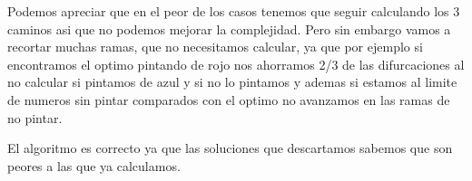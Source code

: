 Podemos apreciar que en el peor de los casos tenemos que seguir calculando los 3 caminos asi que no podemos mejorar la complejidad. Pero sin embargo vamos a recortar muchas ramas, que no necesitamos calcular, ya que por ejemplo si encontramos el optimo pintando de rojo nos ahorramos 2/3 de las difurcaciones al no calcular si pintamos de azul y si no lo pintamos y ademas si estamos al limite de numeros sin pintar comparados con el optimo no avanzamos en las ramas de no pintar.

El algoritmo es correcto ya que las soluciones que descartamos sabemos que son peores a las que ya calculamos.

   





